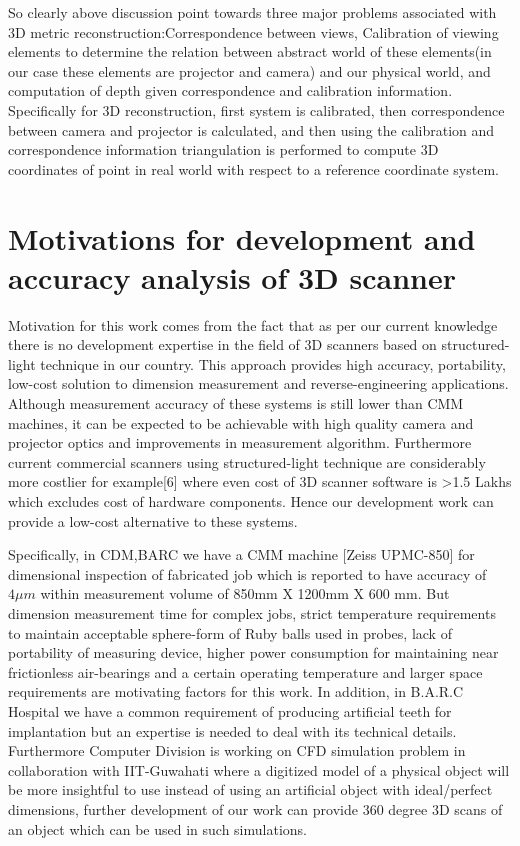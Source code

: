 So clearly above discussion point towards three major problems associated with 3D metric reconstruction:Correspondence between views,  Calibration of viewing elements to determine the relation between abstract world of these elements(in our case these elements are projector and camera) and  our physical world, and computation of depth given correspondence and calibration information.  Specifically for 3D reconstruction, first system is calibrated, then correspondence between camera and projector is calculated, and then using the calibration and correspondence information triangulation is performed to compute 3D coordinates of point in real world with respect to a reference coordinate system. 
 
\section{Motivations for development and accuracy analysis of 3D scanner} 
Motivation for this work comes from the fact that as per our current knowledge there is no development expertise in the field of 3D scanners based on structured-light technique in our country. This approach provides high accuracy, portability, low-cost solution to dimension measurement and reverse-engineering applications. Although measurement accuracy of these systems is still lower than CMM machines, it can be expected to be achievable with high quality camera and projector optics and improvements in measurement algorithm. 
Furthermore current commercial scanners using structured-light technique are considerably more costlier for example[6] where even cost of 3D scanner software is >1.5 Lakhs which excludes  cost of hardware components. Hence our development work can provide a low-cost alternative to these systems.\newline 


Specifically, in CDM,BARC we have a CMM machine [Zeiss UPMC-850] for dimensional inspection of fabricated job which is reported to have accuracy of $4\mu m$ within measurement volume of 850mm X 1200mm X 600 mm. But dimension measurement time for complex jobs, strict temperature requirements to maintain acceptable sphere-form of Ruby balls used in probes, lack of portability of measuring device, higher power consumption for maintaining near frictionless air-bearings and a certain operating temperature and larger space requirements are motivating factors for this work. In addition, in B.A.R.C Hospital we have a common requirement of producing artificial teeth for implantation but an expertise is needed to deal with its technical details. Furthermore Computer Division is working on CFD simulation problem in collaboration with IIT-Guwahati where a digitized model of a physical object will be more insightful to use instead of using an artificial object with ideal/perfect dimensions, further development of our work can provide 360 degree 3D scans of an object which can be used in such simulations. 
 
